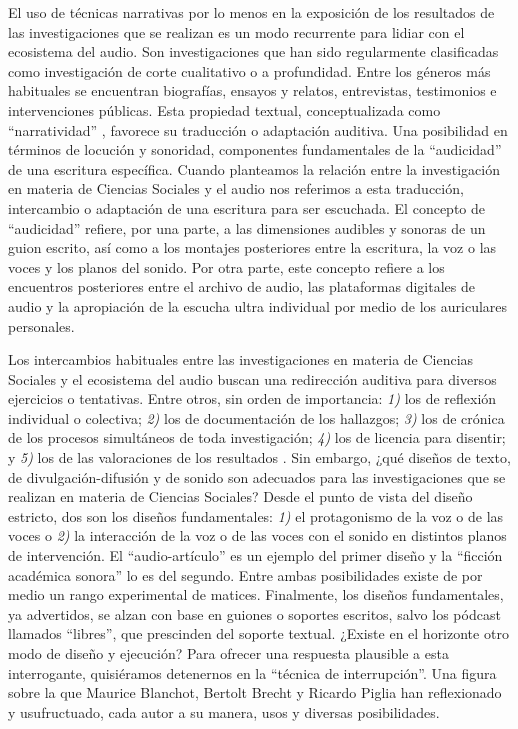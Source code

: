 \documentclass[
  spanish,
  11pt,
  a4paper,
]{scrbook}
\begin{document}
El uso de técnicas narrativas por lo menos en la exposición de los
resultados de las investigaciones que se realizan es un modo recurrente
para lidiar con el ecosistema del audio. Son investigaciones que han
sido regularmente clasificadas como investigación de corte cualitativo o
a profundidad. Entre los géneros más habituales se encuentran
biografías, ensayos y relatos, entrevistas, testimonios e intervenciones
públicas. Esta propiedad textual, conceptualizada como ``narratividad''
\autocite{Lagmanovich2013}, favorece su traducción o adaptación
auditiva. Una posibilidad en términos de locución y sonoridad,
componentes fundamentales de la ``audicidad''
\autocite{BeltranNieves2022} de una escritura específica. Cuando
planteamos la relación entre la investigación en materia de Ciencias
Sociales y el audio nos referimos a esta traducción, intercambio o
adaptación de una escritura para ser escuchada. El concepto de
``audicidad'' \autocite[247-48]{BeltranNieves2022} refiere, por una
parte, a las dimensiones audibles y sonoras de un guion escrito, así
como a los montajes posteriores entre la escritura, la voz o las voces y
los planos del sonido. Por otra parte, este concepto refiere a los
encuentros posteriores entre el archivo de audio, las plataformas
digitales de audio y la apropiación de la escucha ultra individual por
medio de los auriculares personales.

Los intercambios habituales entre las investigaciones en materia de
Ciencias Sociales y el ecosistema del audio buscan una redirección
auditiva para diversos ejercicios o tentativas. Entre otros, sin orden
de importancia: \emph{1)} los de reflexión individual o colectiva;
\emph{2)} los de documentación de los hallazgos; \emph{3)} los de
crónica de los procesos simultáneos de toda investigación; \emph{4)} los
de licencia para disentir; y \emph{5)} los de las valoraciones de los
resultados \autocite[248]{BeltranNieves2022}. Sin embargo, ¿qué diseños
de texto, de divulgación-difusión y de sonido son adecuados para las
investigaciones que se realizan en materia de Ciencias Sociales? Desde
el punto de vista del diseño estricto, dos son los diseños
fundamentales: \emph{1)} el protagonismo de la voz o de las voces o
\emph{2)} la interacción de la voz o de las voces con el sonido en
distintos planos de intervención. El ``audio-artículo''
\autocite{UAMLerma2021} es un ejemplo del primer diseño y la ``ficción
académica sonora'' \autocite{FESAcatlan2022,FESAcatlan2023} lo es del
segundo. Entre ambas posibilidades existe de por medio un rango
experimental de matices. Finalmente, los diseños fundamentales, ya
advertidos, se alzan con base en guiones o soportes escritos, salvo los
pódcast llamados ``libres'', que prescinden del soporte textual. ¿Existe
en el horizonte otro modo de diseño y ejecución? Para ofrecer una
respuesta plausible a esta interrogante, quisiéramos detenernos en la
``técnica de interrupción''. Una figura sobre la que Maurice Blanchot,
Bertolt Brecht y Ricardo Piglia han reflexionado y usufructuado, cada
autor a su manera, usos y diversas posibilidades.
\end{document}
